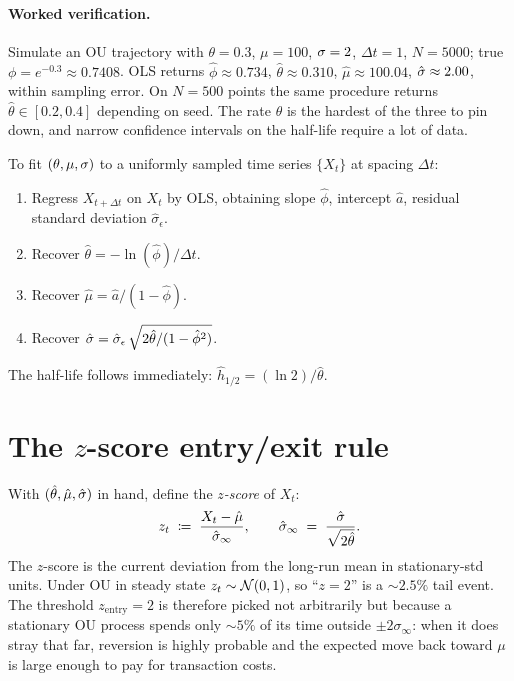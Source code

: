\paragraph{Worked verification.} Simulate an OU trajectory with
$\theta = 0.3$, $\mu = 100$, $\sigma = 2$, $\Delta t = 1$,
$N = 5000$; true $\phi = e^{-0.3} \approx 0.7408$. OLS returns
$\hat\phi \approx 0.734$, $\hat\theta \approx 0.310$,
$\hat\mu \approx 100.04$, $\hat{\sigma} \approx 2.00$, within
sampling error. On $N = 500$ points the same procedure returns
$\hat\theta \in [0.2, 0.4]$ depending on seed. The rate $\theta$
is the hardest of the three to pin down, and narrow confidence
intervals on the half-life require a lot of data.

\begin{keyfactbox}
To fit $(\theta, \mu, \sigma)$ to a uniformly sampled time
series $\{X_t\}$ at spacing $\Delta t$:
\begin{enumerate}
  \item Regress $X_{t+\Delta t}$ on $X_t$ by OLS, obtaining
  slope $\hat\phi$, intercept $\hat a$, residual standard
  deviation $\hat\sigma_\epsilon$.
  \item Recover $\hat\theta = -\ln(\hat\phi)/\Delta t$.
  \item Recover $\hat\mu = \hat a / (1 - \hat\phi)$.
  \item Recover
  $\hat{\sigma} = \hat\sigma_\epsilon\,\sqrt{2\hat\theta/(1-\hat\phi^2)}$.
\end{enumerate}
The half-life follows immediately:
$\hat h_{1/2} = (\ln 2)/\hat\theta$.
\end{keyfactbox}

\section{The \texorpdfstring{$z$}{z}-score entry/exit rule}
\label{sec:ch9_zscore}

With $(\hat\theta, \hat\mu, \hat{\sigma})$ in hand, define the
\emph{$z$-score} of $X_t$:
\begin{equation}
  z_t \;\coloneqq\; \frac{X_t - \hat\mu}{\hat\sigma_\infty},
  \qquad
  \hat\sigma_\infty \;=\; \frac{\hat{\sigma}}{\sqrt{2\hat\theta}}.
  \label{eq:zscore_def}
\end{equation}
The $z$-score is the current deviation from the long-run mean
in stationary-std units. Under OU in steady state
$z_t \sim \mathcal{N}(0, 1)$, so ``$z = 2$'' is a $\sim 2.5\%$ tail
event. The threshold $z_{\text{entry}} = 2$ is therefore picked
not arbitrarily but because a stationary OU process spends only
$\sim 5\%$ of its time outside $\pm 2\sigma_\infty$: when it does
stray that far, reversion is highly probable and the expected
move back toward $\mu$ is large enough to pay for transaction
costs.

